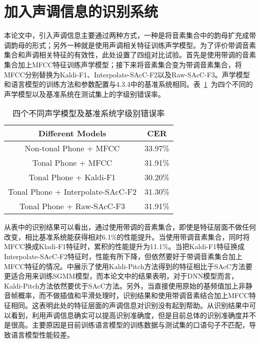\section{加入声调信息的识别系统}
本论文中，引入声调信息主要通过两种方式，一种是将音素集合中的韵母扩充成带调韵母的形式；另外一种就是使用声调相关特征训练声学模型。为了评价带调音素集合和声调相关特征的有效性，此处设置了四组对比试验。首先是使用带调的音素集合加上MFCC特征训练声学模型；接下来将音素集合变为带调音素集合，将MFCC分别替换为Kaldi-F1、Interpolate-SAcC-F2以及Raw-SAcC-F3。声学模型和语言模型的训练方法和参数配置与4.3.4中的基准系统相同。表~\ref{tab:table4}~为四个不同的声学模型以及基准系统在测试集上的字级别错误率。
\begin{table}[htbp]
\caption{四个不同声学模型及基准系统字级别错误率}\label{tab:table4}
\vspace{0.5em}\centering\wuhao
\begin{tabular}{cc}
\toprule[1.5pt]
Different Models & CER \\
\midrule[1pt]
Non-tonal Phone + MFCC & 33.97\% \\
Tonal Phone + MFCC & 31.91\% \\
Tonal Phone + Kaldi-F1 & 30.20\% \\
Tonal Phone + Interpolate-SAcC-F2 & 31.30\% \\
Tonal Phone + Raw-SAcC-F3 & 31.91\% \\
\bottomrule[1.5pt]
\end{tabular}
\vspace{\baselineskip}
\end{table}

从表中的识别结果可以看出，通过使用带调的音素集合，即使是特征层面不做任何改变，相比基准系统能获得相对6.1\%的性能提升。当使用带调音素集合，同时将MFCC换成Kladi-F1特征时，累积的性能提升为11.1\%。当把Kaldi-F1特征换成Interpolate-SAcC-F2特征时，性能有所下降，但依然要好于带调音素集合加上MFCC特征的情况。\cite{ghahremani2014pitch}中展示了使用Kaldi-Pitch方法得到的特征相比于SAcC方法要更适合用来训练SGMM模型，而本论文中的结果表明，对于DNN模型而言，Kaldi-Pitch方法依然要优于SAcC方法。另外，当直接使用原始的基频值加上非静音帧概率，而不做插值和平滑处理时，识别结果和使用带调音素结合加上MFCC特征相同。这表明此处的特征层面的声调信息对识别没有起到帮助。从识别结果中可以看到，利用声调信息确实可以提高识别准确度，但是目前总体的识别准确度并不是很高。主要原因是目前训练语言模型的训练数据与测试集的口语句子不匹配，导致语言模型性能较差。
